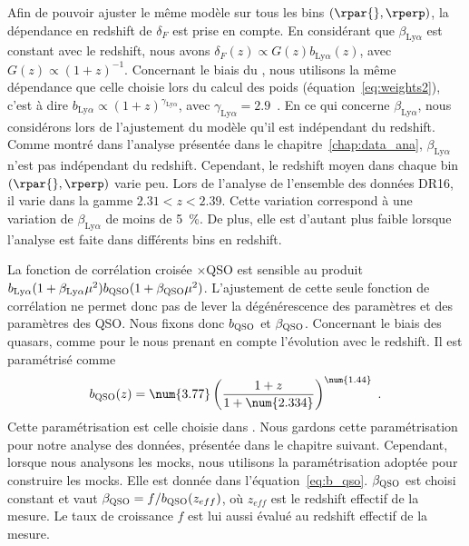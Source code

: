 Afin de pouvoir ajuster le même modèle sur tous les bins $(\rpar{}, \rperp)$, la dépendance en redshift de $\delta_F$ est prise en compte.
En considérant que $\beta_{\mathrm{Ly}\alpha}$ est constant avec le redshift, nous avons $\delta_F(z) \propto G(z) b_{\mathrm{Ly}\alpha}(z)$, avec $G(z) \propto (1+z)^{-1}$.
Concernant le biais du \lya{}, nous utilisons la même dépendance que celle choisie lors du calcul des poids (équation~\ref{eq:weights2}), c'est à dire $b_{\mathrm{Ly}\alpha} \propto (1+z)^{\gamma_{\mathrm{Ly}\alpha}}$, avec $\gamma_{\mathrm{Ly}\alpha} = 2.9$~\autocite{McDonald2004}.
En ce qui concerne $\beta_{\mathrm{Ly}\alpha}$, nous considérons lors de l'ajustement du modèle qu'il est indépendant du redshift. Comme montré dans l'analyse présentée dans le chapitre~\ref{chap:data_ana}, $\beta_{\mathrm{Ly}\alpha}$ n'est pas indépendant du redshift. Cependant, le redshift moyen dans chaque bin $(\rpar{}, \rperp)$ varie peu. Lors de l'analyse de l'ensemble des données DR16, il varie dans la gamme $\num{2.31} < z < \num{2.39}$. Cette variation correspond à une variation de $\beta_{\mathrm{Ly}\alpha}$ de moins de \SI{5}{\percent}. De plus, elle est d'autant plus faible lorsque l'analyse est faite dans différents bins en redshift.

La fonction de corrélation croisée \lya{}$\times$QSO est sensible au produit $b_{\mathrm{Ly}\alpha}(1+\beta_{\mathrm{Ly}\alpha} \mu^2) b_{\textsc{QSO}}(1+\beta_{\textsc{QSO}} \mu^2)$.
L'ajustement de cette seule fonction de corrélation ne permet donc pas de lever la dégénérescence des paramètres \lya{} et des paramètres des QSO.
Nous fixons donc $b_{\textsc{QSO}}$ et $\beta_{\textsc{QSO}}$. Concernant le biais des quasars, comme pour le \lya{} nous prenant en compte l'évolution avec le redshift. Il est paramétrisé comme
\begin{equation}
  b_{\textsc{QSO}}(z) = \num{3.77} \left( \frac{1 + z}{1+\num{2.334}} \right)^{\num{1.44}} \; . 
\end{equation}
Cette paramétrisation est celle choisie dans \textcite{DuMasdesBourboux2020}. Nous gardons cette paramétrisation pour notre analyse des données, présentée dans le chapitre suivant. Cependant, lorsque nous analysons les mocks, nous utilisons la paramétrisation adoptée pour construire les mocks. Elle est donnée dans l'équation~\ref{eq:b_qso}.
  $\beta_{\textsc{QSO}}$ est choisi constant et vaut $\beta_{\textsc{QSO}} = f / b_{\textsc{QSO}}(z_{eff})$, où $z_{eff}$ est le redshift effectif de la mesure.
  Le taux de croissance $f$ est lui aussi évalué au redshift effectif de la mesure.


